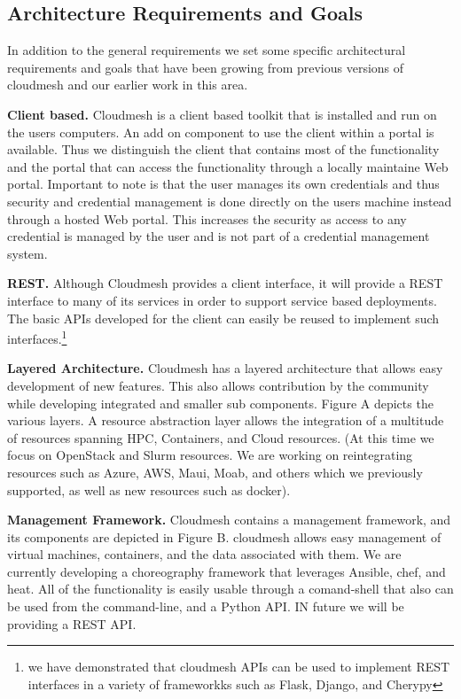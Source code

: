 \subsection{Architecture Requirements and Goals}

In addition to the general requirements we set some specific
architectural requirements and goals that have been growing from
previous versions of cloudmesh and our earlier work in this area.

\begin{description}

\item{\bf Client based.} Cloudmesh is a
  client based toolkit that is installed and run on the users
  computers. An add on component to use the client within a portal is
  available. Thus we distinguish the client that contains most of the
  functionality and the portal that can access the functionality
  through a locally maintaine Web portal. Important to note is that
  the user manages its own credentials and thus security and
  credential management is done directly on the users machine instead
  through a hosted Web portal. This increases the security as access
  to any credential is managed by the user and is not part of a
  credential management system.

\item{\bf REST.} Although Cloudmesh provides a client interface, it
will provide a REST interface to many of its services in order to
support service based deployments. The basic APIs developed for the
client can easily be reused to implement such interfaces.\footnote{we
  have demonstrated that cloudmesh APIs can be used to implement REST
  interfaces in a variety of frameworkks such as Flask, Django, and Cherypy}

\item{\bf Layered Architecture.} Cloudmesh has a layered
architecture that allows easy development of new features. This also
allows contribution by the community while developing integrated and
smaller sub components. Figure A depicts the various layers. A
resource abstraction layer allows the integration of a multitude of
resources spanning HPC, Containers, and Cloud resources. (At this time
we focus on OpenStack and Slurm resources. We are working on
reintegrating resources such as Azure, AWS, Maui, Moab, and others
which we previously supported, as well as new resources such as
docker).

\item{\bf Management Framework.} Cloudmesh contains a
management framework, and its components are depicted in Figure
B. cloudmesh allows easy management of virtual machines, containers,
and the data associated with them. We are currently developing a
choreography framework that leverages Ansible, chef, and heat. All of
the functionality is easily usable through a comand-shell that also
can be used from the command-line, and a Python API. IN future we will
be providing a REST API.


\end{description}
